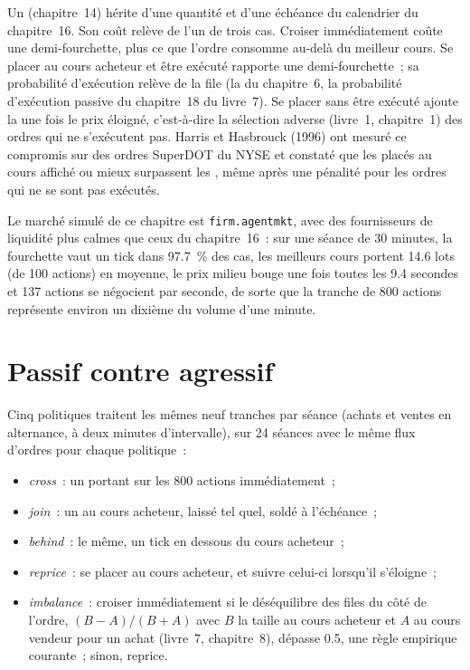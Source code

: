 Un  (chapitre~14) hérite d'une quantité et d'une échéance du calendrier du chapitre~16. Son coût relève de l'un de trois cas. Croiser immédiatement coûte
une demi-fourchette, plus ce que l'ordre consomme au-delà du meilleur cours. Se placer au cours acheteur et être exécuté rapporte une demi-fourchette~; sa probabilité d'exécution
relève de la file (la  du chapitre~6, la probabilité d'exécution passive du chapitre~18 du livre~7). Se placer sans être exécuté ajoute la
 une fois le prix éloigné, c'est-à-dire la sélection adverse (livre~1, chapitre~1) des ordres qui ne s'exécutent pas. Harris et Hasbrouck (1996)
ont mesuré ce compromis sur des ordres SuperDOT du NYSE et constaté que les  placés au cours affiché ou mieux surpassent les , même après une pénalité
pour les ordres qui ne se sont pas exécutés.

Le marché simulé de ce chapitre est \texttt{firm.agentmkt}, avec des fournisseurs de liquidité plus calmes que ceux du chapitre~16~: sur une séance de 30 minutes, la fourchette vaut
un tick dans 97.7~\% des cas, les meilleurs cours portent 14.6 lots (de 100 actions) en moyenne, le prix milieu bouge une fois toutes les 9.4 secondes et 137 actions se négocient par
seconde, de sorte que la tranche de 800 actions représente environ un dixième du volume d'une minute.

\section{Passif contre agressif}

Cinq politiques traitent les mêmes neuf tranches par séance (achats et ventes en alternance, à deux minutes d'intervalle), sur 24 séances avec le même flux d'ordres pour
chaque politique~:
\begin{itemize}
\item \emph{cross}~: un  portant sur les 800 actions immédiatement~;
\item \emph{join}~: un  au cours acheteur, laissé tel quel, soldé à l'échéance~;
\item \emph{behind}~: le même, un tick en dessous du cours acheteur~;
\item \emph{reprice}~: se placer au cours acheteur, et suivre celui-ci lorsqu'il s'éloigne~;
\item \emph{imbalance}~: croiser immédiatement si le déséquilibre des files du côté de l'ordre, $(B-A)/(B+A)$ avec $B$ la taille au cours acheteur et $A$ au cours vendeur
pour un achat (livre~7, chapitre~8), dépasse 0.5, une règle empirique courante~; sinon, reprice.
\end{itemize}

